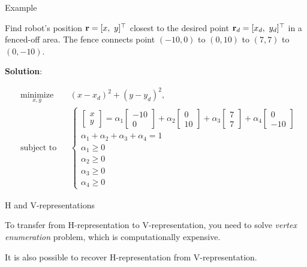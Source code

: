 \documentclass{beamer}
\begin{document}
\begin{frame}{Example}
	\begin{flushleft}
		
		Find robot's position $\bo{r} = [x, \ y]\T$  closest to the desired point $\mathbf{r}_d= [x_d, \ y_d]^\top$ in a fenced-off area. The fence connects point $(-10, 0)$ to $(0, 10)$ to $(7, 7)$ to $(0, -10)$.
		
		\bigskip
		
		\textbf{Solution}:
		
		\begin{equation}
			\begin{aligned}
				& \underset{x, y}{\text{minimize}}
				& & (x-x_d)^2 + (y-y_d)^2, \\
				& \text{subject to}
				& & 
				\begin{cases}
					\begin{bmatrix} x \\y \end{bmatrix}
					=
					\alpha_1
					\begin{bmatrix} -10 \\0 \end{bmatrix}
					+
					\alpha_2
					\begin{bmatrix} 0 \\10 \end{bmatrix}
					+
					\alpha_3
					\begin{bmatrix} 7 \\7 \end{bmatrix}
					+
					\alpha_4
					\begin{bmatrix} 0 \\ -10 \end{bmatrix}
					\\
					\alpha_1 + \alpha_2 + \alpha_3 + \alpha_4 = 1
					\\
					\alpha_1 \geq 0 \\  \alpha_2 \geq 0 \\  \alpha_3 \geq 0 \\  \alpha_4 \geq 0
				\end{cases}
			\end{aligned}
		\end{equation}
		
	\end{flushleft}
\end{frame}




\begin{frame}{H and V-representations}
\begin{flushleft}

To transfer from H-representation to V-representation, you need to solve \emph{vertex enumeration} problem, which is computationally expensive. 

\bigskip

It is also possible to recover H-representation from V-representation. 
 
\end{flushleft}
\end{frame}
\end{document}
